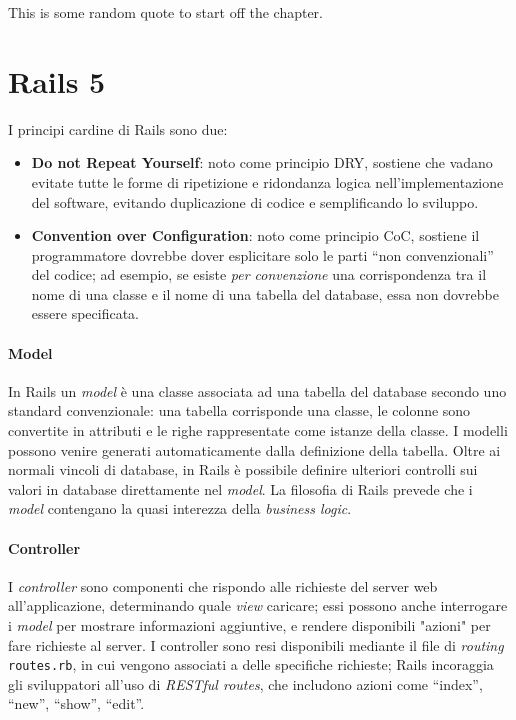 \begin{savequote}[75mm]
This is some random quote to start off the chapter.
\end{savequote}

\chapter{Rails 5}


I principi cardine di Rails sono due:
\begin{itemize}
    \item\textbf{Do not Repeat Yourself}: noto come principio DRY, sostiene che vadano evitate tutte le forme di ripetizione e ridondanza logica nell'implementazione del software, evitando duplicazione di codice e semplificando lo sviluppo.
    \item\textbf{Convention over Configuration}: noto come principio CoC, sostiene il programmatore dovrebbe dover esplicitare solo le parti ``non convenzionali'' del codice; ad esempio, se esiste \textit{per convenzione} una corrispondenza tra il nome di una classe e il nome di una tabella del database, essa non dovrebbe essere specificata.
\end{itemize}


\subsubsection{Model}
In Rails un \textit{model} è una classe associata ad una tabella del database secondo uno standard convenzionale: una tabella corrisponde una classe, le colonne sono convertite in attributi e le righe rappresentate come istanze della classe. I modelli possono venire generati automaticamente dalla definizione della tabella. Oltre ai normali vincoli di database, in Rails è possibile definire ulteriori controlli sui valori in database direttamente nel \textit{model}. La filosofia di Rails prevede che i \textit{model} contengano la quasi interezza della \textit{business logic}.

\subsubsection{Controller}
I \textit{controller} sono componenti che rispondo alle richieste del server web all'applicazione, determinando quale \textit{view} caricare; essi possono anche interrogare i \textit{model} per mostrare informazioni aggiuntive, e rendere disponibili "azioni" per fare richieste al server. I controller sono resi disponibili mediante il file di \textit{routing} \texttt{routes.rb}, in cui vengono associati a delle specifiche richieste; Rails incoraggia gli sviluppatori all'uso di \textit{RESTful routes}, che includono azioni come ``index'', ``new'', ``show'', ``edit''.

